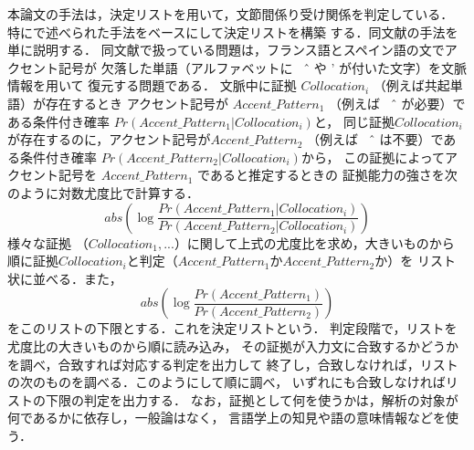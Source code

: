 本論文の手法は，決定リストを用いて，文節間係り受け関係を判定している．
特に\cite{Yarowsky1994}で述べられた手法をベースにして決定リストを構築
する．同文献の手法を単に説明する．
同文献で扱っている問題は，フランス語とスペイン語の文でアクセント記号が
欠落した単語（アルファベットに \^　 や ' が付いた文字）を文脈情報を用いて
復元する問題である．
文脈中に証拠 \(Collocation_i\) （例えば共起単語）が存在するとき
アクセント記号が \(Accent\_Pattern_1\) （例えば \^　 が必要）である条件付き確率
\(Pr(Accent\_Pattern_1 | Collocation_i)\)と，
同じ証拠\(Collocation_i\)が存在するのに，アクセント記号が\(Accent\_Pattern_2\)
（例えば \^　 は不要）である条件付き確率
\(Pr(Accent\_Pattern_2 | Collocation_i)\)から，
この証拠によってアクセント記号を \(Accent\_Pattern_1\) であると推定するときの
証拠能力の強さを次のように対数尤度比で計算する．
\begin{displaymath}
 abs( \log \frac{Pr(Accent\_Pattern_1 | Collocation_i)} {Pr(Accent\_Pattern_2 | Collocation_i)})
\end{displaymath}
様々な証拠 （\(Collocation_1,...\)）に関して上式の尤度比を求め，大きいものから
順に証拠\(Collocation_i\)と判定（\(Accent\_Pattern_1\)か\(Accent\_Pattern_2\)か）を
リスト状に並べる．また，
\begin{displaymath}
 abs(\log \frac{Pr(Accent\_Pattern_1)}{Pr(Accent\_Pattern_2)})
\end{displaymath}
をこのリストの下限とする．これを決定リストという．
判定段階で，リストを尤度比の大きいものから順に読み込み，
その証拠が入力文に合致するかどうかを調べ，合致すれば対応する判定を出力して
終了し，合致しなければ，リストの次のものを調べる．このようにして順に調べ，
いずれにも合致しなければリストの下限の判定を出力する．
なお，証拠として何を使うかは，解析の対象が何であるかに依存し，一般論はなく，
言語学上の知見や語の意味情報などを使う．

